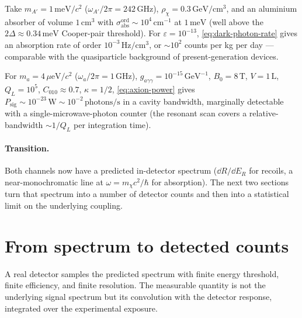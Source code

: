 \begin{example}
\label{ex:dark-photon-rate}
Take $m_{A'}=1\,\text{meV}/c^2$ ($\omega_{A'}/2\pi=242\,\text{GHz}$),
$\rho_\chi=0.3\,\text{GeV}/\text{cm}^3$, and an aluminium absorber
of volume $1\,\text{cm}^3$ with $\sigma_\text{abs}^\text{ord}\sim
10^4\,\text{cm}^{-1}$ at $1\,\text{meV}$ (well above the
$2\Delta\approx 0.34\,\text{meV}$ Cooper-pair threshold). For
$\varepsilon=10^{-13}$, \cref{eq:dark-photon-rate} gives an
absorption rate of order $10^{-3}\,\text{Hz}/\text{cm}^3$, or
$\sim 10^2$ counts per kg per day --- comparable with the
quasiparticle background of present-generation devices.
\end{example}

\begin{example}
\label{ex:axion-power}
For $m_a=4\,\mu\text{eV}/c^2$ ($\omega_a/2\pi=1\,\text{GHz}$),
$g_{a\gamma\gamma}=10^{-15}\,\text{GeV}^{-1}$,
$B_0=8\,\text{T}$, $V=1\,\text{L}$, $Q_L=10^5$, $C_{010}\approx 0.7$,
$\kappa=1/2$, \cref{eq:axion-power} gives
$P_\text{sig}\sim 10^{-23}\,\text{W}\sim 10^{-2}\,\text{photons}/\text{s}$
in a cavity bandwidth, marginally detectable with a
single-microwave-photon counter (the resonant scan covers a
relative-bandwidth $\sim 1/Q_L$ per integration time).
\end{example}

\paragraph{Transition.}
Both channels now have a predicted in-detector spectrum
($\dd R/\dd E_R$ for recoils, a near-monochromatic line at
$\omega=m_\chi c^2/\hbar$ for absorption). The next two sections
turn that spectrum into a number of detector counts and then into
a statistical limit on the underlying coupling.

\section{From spectrum to detected counts}
\label{sec:detector-response}

\begin{phenomenon}
A real detector samples the predicted spectrum with finite energy
threshold, finite efficiency, and finite resolution. The measurable
quantity is not the underlying signal spectrum but its convolution
with the detector response, integrated over the experimental
exposure.
\end{phenomenon}

